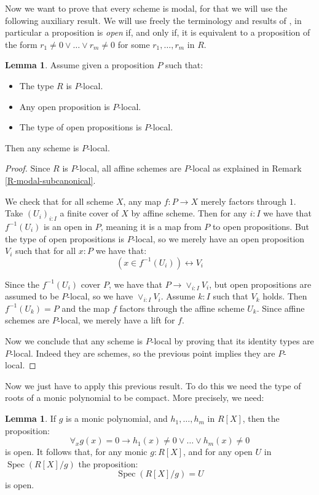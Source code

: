 \documentclass[10pt,a4paper]{article}
\theoremstyle{definition}
\newtheorem{lemma}[theorem]{Lemma}
\DeclareMathOperator{\Spec}{Spec}
\begin{document}
Now we want to prove that every scheme is modal, for that we will use the following auxiliary result. We will use freely the terminology and results of \cite{draft}, in particular a proposition is {\em open}
if, and only if, it is equivalent to a proposition of the form $r_1\neq 0\vee\dots\vee r_m\neq 0$ for some
$r_1,\dots,r_m$ in $R$.

\begin{lemma}\label{scheme-are-sheaf-from-affine}
Assume given a proposition $P$ such that:
\begin{itemize}
\item The type $R$ is $P$-local.
\item Any open proposition is $P$-local.
\item The type of open propositions is $P$-local.
\end{itemize}
Then any scheme is $P$-local.
\end{lemma}

\begin{proof}
Since $R$ is $P$-local, all affine schemes are $P$-local as explained in Remark \ref{R-modal-subcanonical}.

We check that for all scheme $X$, any map $f:P\to X$ merely factors through $1$. Take $(U_i)_{i:I}$ a finite cover of $X$ by affine scheme. Then for any $i:I$ we have that $f^{-1}(U_i)$ is an open in $P$, meaning it is a map from $P$ to open propositions. But the type of open propositions is $P$-local, so we merely have an open proposition $V_i$ such that for all $x:P$ we have that:
\[(x\in f^{-1}(U_i) )\leftrightarrow V_i\]

Since the $f^{-1}(U_i)$ cover $P$, we have that $P\to \lor_{i:I} V_i$, but open propositions are assumed to be $P$-local, so we have $\lor_{i:I} V_i$.
Assume $k:I$ such that $V_k$ holds. Then $f^{-1}(U_k) = P$ and the map $f$ factors through the affine scheme $U_k$. Since affine schemes are $P$-local, we merely have a lift for $f$.

Now we conclude that any scheme is $P$-local by proving that its identity types are $P$-local. Indeed they are schemes, so the previous point implies they are $P$-local.
\end{proof}

Now we just have to apply this previous result. To do this we need the type of roots of a monic polynomial to be compact. More precisely, we need:

\begin{lemma}\label{roots-monic-proper}
  If $g$ is a monic polynomial, and $h_1,\dots,h_m$ in $R[X]$, then the proposition:
  \[
  \forall_xg(x)=0\to h_1(x)\neq 0\vee\dots\vee h_m(x)\neq 0
  \] 
  is open. It follows that, for any monic $g:R[X]$, and for any open $U$ in $\Spec(R[X]/g)$ the proposition:
  \[\Spec(R[X]/g) = U\]
is open.
\end{lemma}
\end{document}
